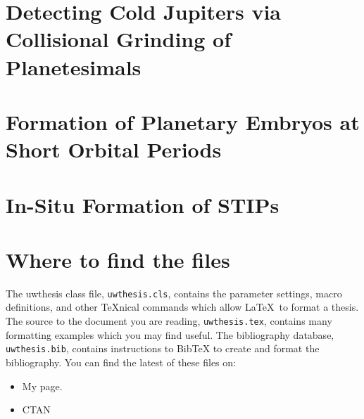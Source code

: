 \documentclass [11pt, proquest] {uwthesis}[2020/02/24]
\begin{document}
\chapter {Detecting Cold Jupiters via Collisional Grinding of Planetesimals}

\chapter {Formation of Planetary Embryos at Short Orbital Periods}

\chapter {In-Situ Formation of STIPs}

%
%
\nocite{*}   %


%
%
\appendix
\raggedbottom\sloppy
 
 
\chapter{Where to find the files}
 
The uwthesis class file, {\tt uwthesis.cls}, contains the parameter settings,
macro definitions, and other \TeX nical commands which
allow \LaTeX\ to format a thesis.  
The source to
the document you are reading, {\tt uwthesis.tex},
contains many formatting examples
which you may find useful.
The bibliography database, {\tt uwthesis.bib}, contains instructions
to BibTeX to create and format the bibliography.
You can find the latest of these files on:

\begin{itemize}
\item My page.
\begin{description}
\item[] \verb%https://staff.washington.edu/fox/tex/thesis.shtml%
\end{description}

\item CTAN

\end{itemize}

\end{document}
